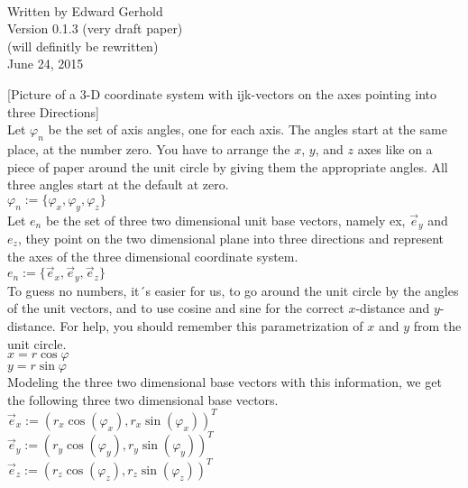 \documentclass{article}
\begin{document}
\begin{center}
\Large{}\\
\tiny
Written by Edward Gerhold\\

Version 0.1.3 (very draft paper)\\
(will definitly be rewritten)\\

June 24, 2015\\
\end{center}


[Picture of a 3-D coordinate system with ijk-vectors on the axes pointing
into three Directions]\\

Let $\varphi_n$ be the set of axis angles, one for each axis. The angles start
at the same place, at the number zero. You have to arrange the $x$, $y$, and
$z$ axes like on a piece of paper around the unit circle by giving them the
appropriate angles. All three angles start at the default at zero.\\

$\varphi_n := \{\varphi_x, \varphi_y, \varphi_z\}$\\

Let $e_n$ be the set of three two dimensional unit base vectors, namely ex,
$\vec{e}_y$ and $e_z$, they point on the two dimensional plane into three directions
and represent the axes of the three dimensional coordinate system.\\

$e_n := \{\vec{e}_x, \vec{e}_y, \vec{e}_z\}$\\
 
To guess no numbers, it´s easier for us, to go around the unit circle by
the angles of the unit vectors, and to use cosine and sine for the correct
$x$-distance and $y$-distance. For help, you should remember this parametrization
of $x$ and $y$ from the unit circle.\\

$x = r \cos \varphi$\\
$y = r \sin \varphi$\\

Modeling the three two dimensional base vectors with this information,
we get the following three two dimensional base vectors.\\

$\vec{e}_x := (r_x\cos(\varphi_x), r_x\sin(\varphi_x) )^T$\\
$\vec{e}_y := (r_y\cos(\varphi_y), r_y\sin(\varphi_y) )^T$\\
$\vec{e}_z := (r_z\cos(\varphi_z), r_z\sin(\varphi_z) )^T$\\
\end{document}
